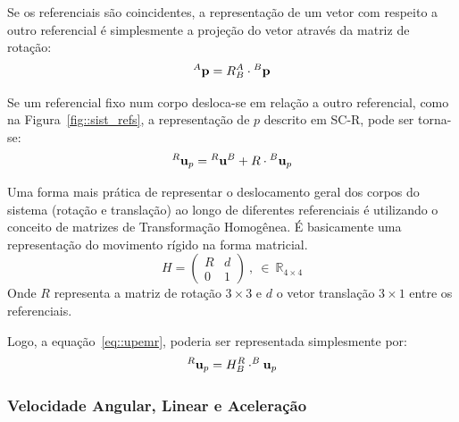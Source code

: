 Se os referenciais são coincidentes, a representação de um vetor com respeito a
outro referencial é simplesmente a projeção do vetor através da matriz de
rotação:
%
\begin{equation}
^{A}\textrm{\textbf{p}} = R_{B}^{A} \cdot {}^{B}\textrm{\textbf{p}}
\end{equation}
%

Se um referencial fixo num corpo desloca-se em relação a outro referencial, como
na Figura~\ref{fig::sist_refs}, a representação de $p$ descrito em SC-R, pode
ser torna-se:
%
\begin{equation} \label{eq::upemr}
	^{R}\textrm{\textbf{u}}_{p} = {}^{R}\textrm{\textbf{u}}^{B} + R \cdot
	{}^{B}\textrm{\textbf{u}}_{p}
\end{equation}
%

Uma forma mais prática de representar o deslocamento geral dos corpos do sistema
(rotação e translação) ao longo de diferentes referenciais é utilizando o
conceito de matrizes de Transformação Homogênea. É basicamente uma representação
do movimento rígido na forma matricial. 
\begin{equation}
	H = 
\begin{pmatrix}
R & d\\ 
0 & 1
\end{pmatrix} ~,~ \in ~ \mathbb{R}_{4\times4}
\end{equation}
%
Onde $R$ representa a matriz de rotação $3\times3$ e $d$ o vetor translação
$3\times1$ entre os referenciais.

Logo, a equação~\ref{eq::upemr}, poderia ser representada simplesmente por:
%
\begin{equation}
	^{R}\textrm{\textbf{u}}_{p} = H_{B}^{R} \cdot ^{B}\textrm{\textbf{u}}_{p}
\end{equation}

\subsubsection{Velocidade Angular, Linear e Aceleração}


